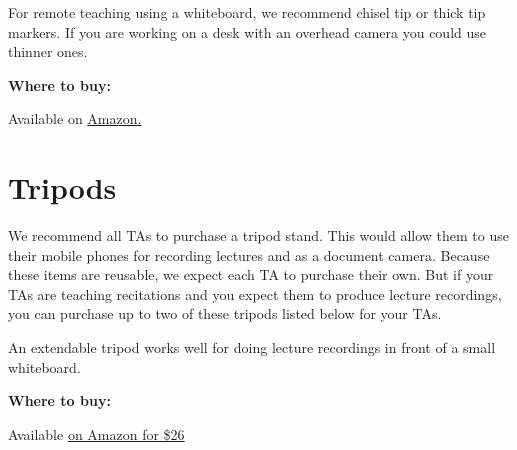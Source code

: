 \begin{gram}[Whiteboards]
\begin{itemize}

\end{itemize}

\end{gram}


\begin{gram}
For remote teaching using a whiteboard, we recommend chisel tip or thick tip markers. If you are working on a desk with an overhead camera you could use thinner ones.

\textbf{Where to buy:}

Available on
\href{https://www.amazon.com/80556-Low-Odor-Chisel-Assorted-7-Piece/dp/B00006JNJP/ref=sr_1_29?crid=3BOQYY0J0U2OZ&dchild=1&keywords=whiteboard+markers&qid=1598114240&refinements=p_n_location_browse-bin%3A6473192011&rnid=2726075011&s=office-products&sprefix=whiteboard%2Caps%2C162&sr=1-29}
{Amazon.}

\end{gram}

\section{Tripods}

We recommend all TAs to purchase a tripod stand. This would allow them to use their mobile phones for recording lectures and as a document camera.  
%
Because these items are reusable, we expect each TA to purchase their own.
%
But if your TAs are teaching recitations and you expect them to
produce lecture recordings, you can purchase up to two of these
tripods listed below for your TAs.
%

\begin{gram}
An extendable tripod works well for doing lecture recordings in front of a small whiteboard.

\textbf{Where to buy:}

Available
\href{https://www.amazon.com/UBeesize-Extendable-Bluetooth-Aluminum-Lightweight/dp/B07NWC3L95/ref=pd_ybh_a_27?_encoding=UTF8&psc=1&refRID=7G79BF5K1T32C0NJXB51}
{on Amazon for \$26}
\end{gram}

